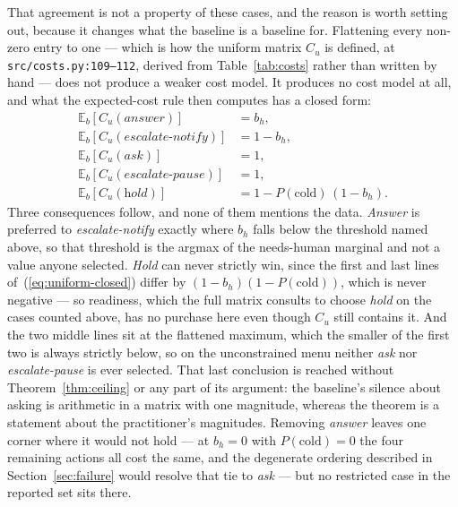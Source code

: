 \documentclass{article}
\begin{document}
That agreement is not a property of these cases, and the reason is worth setting
out, because it changes what the baseline is a baseline for. Flattening every
non-zero entry to one --- which is how the uniform matrix $C_u$ is defined, at
\texttt{src/costs.py:109--112}, derived from Table~\ref{tab:costs} rather than
written by hand --- does not produce a weaker cost model. It produces no cost model
at all, and what the expected-cost rule then computes has a closed form:
\begin{equation}
\label{eq:uniform-closed}
\begin{aligned}
\mathbb{E}_b[C_u(\textit{answer})] &= b_h, \\
\mathbb{E}_b[C_u(\textit{escalate-notify})] &= 1 - b_h, \\
\mathbb{E}_b[C_u(\textit{ask})] &= 1, \\
\mathbb{E}_b[C_u(\textit{escalate-pause})] &= 1, \\
\mathbb{E}_b[C_u(\textit{hold})] &= 1 - P(\text{cold})\,(1 - b_h).
\end{aligned}
\end{equation}
Three consequences follow, and none of them mentions the data. \emph{Answer} is
preferred to \emph{escalate-notify} exactly where $b_h$ falls below the threshold
named above, so that threshold is the argmax of the needs-human marginal and not a
value anyone selected. \emph{Hold} can never strictly win, since the first and last
lines of~(\ref{eq:uniform-closed}) differ by $(1 - b_h)(1 - P(\text{cold}))$, which
is never negative --- so readiness, which the full matrix consults to choose
\emph{hold} on the cases counted above, has no purchase here even though $C_u$ still
contains it. And the two middle lines sit at the flattened maximum, which the
smaller of the first two is always strictly below, so on the unconstrained menu
neither \emph{ask} nor \emph{escalate-pause} is ever selected. That last conclusion
is reached without Theorem~\ref{thm:ceiling} or any part of its argument: the
baseline's silence about asking is arithmetic in a matrix with one magnitude,
whereas the theorem is a statement about the practitioner's magnitudes. Removing
\emph{answer} leaves one corner where it would not hold --- at $b_h = 0$ with
$P(\text{cold}) = 0$ the four remaining actions all cost the same, and the
degenerate ordering described in Section~\ref{sec:failure} would resolve that tie to
\emph{ask} --- but no restricted case in the reported set sits there.
\end{document}
